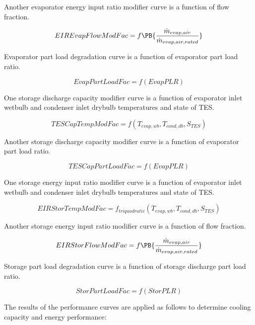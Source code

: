 Another evaporator energy input ratio modifier curve is a function of flow fraction.

\begin{equation}
EIREvapFlowModFac = f\PB{\frac{\dot{m}_{evap,air}}{\dot{m}_{evap,air,rated}}}
\end{equation}

Evaporator part load degradation curve is a function of evaporator part load ratio.

\begin{equation}
EvapPartLoadFac = f\left( {EvapPLR} \right)
\end{equation}

One storage discharge capacity modifier curve is a function of evaporator inlet wetbulb and condenser inlet drybulb temperatures and state of TES.

\begin{equation}
TESCapTempModFac = f\left( {{T_{evap,wb}},{T_{cond,db}},{S_{TES}}} \right)
\end{equation}

Another storage discharge capacity modifier curve is a function of evaporator part load ratio.

\begin{equation}
TESCapPartLoadFac = f\left( {EvapPLR} \right)
\end{equation}

One storage energy input ratio modifier curve is a function of evaporator inlet wetbulb and condenser inlet drybulb temperatures and state of TES.

\begin{equation}
EIRStorTempModFac = {f_{triquadratic}}\left( {{T_{evap,wb}},{T_{cond,db}},{S_{TES}}} \right)
\end{equation}

Another storage energy input ratio modifier curve is a function of flow fraction.

\begin{equation}
  EIRStorFlowModFac = f\PB{\frac{\dot{m}_{evap,air}}{\dot{m}_{evap,air,rated}}}
\end{equation}

Storage part load degradation curve is a function of storage discharge part load ratio.

\begin{equation}
StorPartLoadFac = f\left( {StorPLR} \right)
\end{equation}

The results of the performance curves are applied as follows to determine cooling capacity and energy performance:

